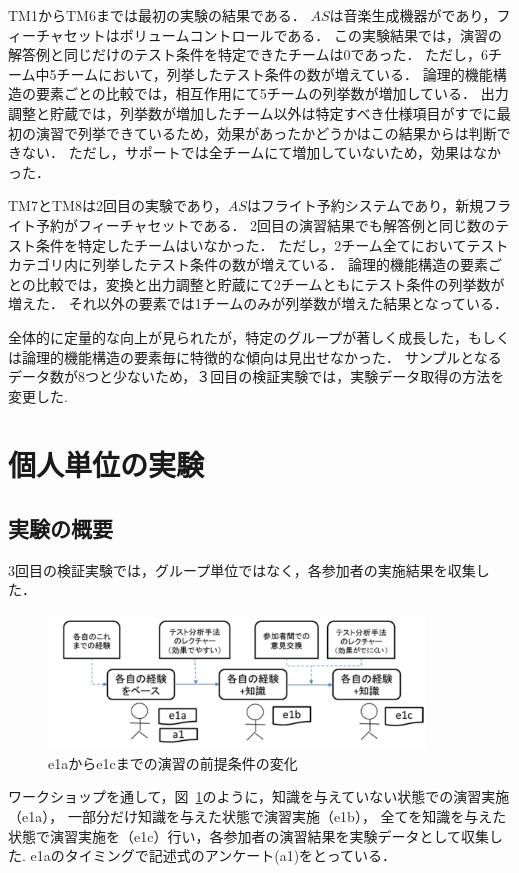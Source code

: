TM1からTM6までは最初の実験の結果である．
$AS$は音楽生成機器がであり，フィーチャセットはボリュームコントロールである．
この実験結果では，演習の解答例と同じだけのテスト条件を特定できたチームは0であった．
ただし，6チーム中5チームにおいて，列挙したテスト条件の数が増えている．
論理的機能構造の要素ごとの比較では，相互作用にて5チームの列挙数が増加している．
出力調整と貯蔵では，列挙数が増加したチーム以外は特定すべき仕様項目がすでに最初の演習で列挙できているため，効果があったかどうかはこの結果からは判断できない．
ただし，サポートでは全チームにて増加していないため，効果はなかった．

TM7とTM8は2回目の実験であり，$AS$はフライト予約システムであり，新規フライト予約がフィーチャセットである．
2回目の演習結果でも解答例と同じ数のテスト条件を特定したチームはいなかった．
ただし，2チーム全てにおいてテストカテゴリ内に列挙したテスト条件の数が増えている．
論理的機能構造の要素ごとの比較では，変換と出力調整と貯蔵にて2チームともにテスト条件の列挙数が増えた．
それ以外の要素では1チームのみが列挙数が増えた結果となっている．

全体的に定量的な向上が見られたが，特定のグループが著しく成長した，もしくは論理的機能構造の要素毎に特徴的な傾向は見出せなかった．
サンプルとなるデータ数が8つと少ないため，３回目の検証実験では，実験データ取得の方法を変更した.

\newpage
\section{個人単位の実験}
\subsection{実験の概要}
3回目の検証実験では，グループ単位ではなく，各参加者の実施結果を収集した．
\begin{figure}[h]
\begin{center}
\includegraphics[width=10cm]{./image/D-3-Fig8.png}
\caption{e1aからe1cまでの演習の前提条件の変化}
\label{fig:D-3-Fig8}
\end{center}
\end{figure}
ワークショップを通して，図~\ref{fig:D-3-Fig8}のように，知識を与えていない状態での演習実施（e1a），
一部分だけ知識を与えた状態で演習実施（e1b），
全てを知識を与えた状態で演習実施を（e1c）行い，各参加者の演習結果を実験データとして収集した.
e1aのタイミングで記述式のアンケート(a1)をとっている．

